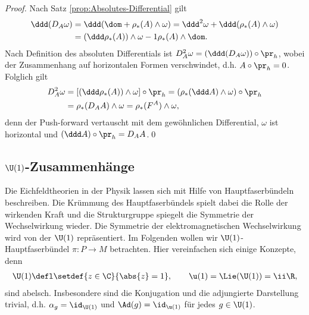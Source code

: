 \documentclass[%
	paper=a5,%
	fleqn,%
	DIV=18,%
	BCOR=0mm,
	fontsize=11pt,
	titlepage=false,%
	bibliography=totoc,
	DIV=18,%
	twoside=true,
	pdftitle=Riemannsche Geometrie,
	pdfauthor=Uwe Semmelmann,
	numbers=noendperiod]%
	{scrbook}
\begin{document}
\begin{proof}
Nach Satz \ref{prop:Absolutes-Differential} gilt
\begin{align*}
\ddd (D_A \omega) &=
\ddd(\dom + \rho_*(A)\wedge \omega)
= \ddd^2\omega + \ddd(\rho_*(A)\wedge \omega)\\
&= (\ddd\rho_*(A))\wedge \omega -1 \rho_*(A)\wedge \dom. 
\end{align*}
Nach Definition des absoluten Differentials ist $D_A^2 \omega = (\ddd(
D_A\omega))\circ\pr_h$, wobei der Zusammenhang  auf horizontalen
Formen verschwindet, d.h. $A\circ\pr_h = 0$. Folglich gilt
\begin{align*}
D_A^2\omega &= [(\ddd\rho_*(A))\wedge \omega]\circ\pr_h
= (\rho_*(\ddd A)\wedge \omega)\circ\pr_h\\
&= \rho_*(D_A A)\wedge \omega
= \rho_*(F^A)\wedge \omega,
\end{align*}
denn der Push-forward vertauscht mit dem gewöhnlichen Differential, $\omega$ ist
horizontal und $(\ddd A)\circ\pr_h = D_A A$.\qed
\end{proof}




\subsection{$\U(1)$-Zusammenhänge}

Die Eichfeldtheorien in der Physik lassen sich mit Hilfe von Hauptfaserbündeln
beschreiben. Die Krümmung des Hauptfaserbündels spielt dabei die Rolle der
wirkenden Kraft und die Strukturgruppe spiegelt die Symmetrie der Wechselwirkung
wieder. Die Symmetrie der elektromagnetischen Wechselwirkung wird von der
$\U(1)$ repräsentiert. Im Folgenden wollen wir $\U(1)$-Hauptfaserbündel
$\pi: P\to M$ betrachten. Hier vereinfachen sich einige Konzepte, denn
\begin{align*}
\U(1) \defl \setdef{z\in\C}{\abs{z}=1},\qquad \u(1) = \Lie(\U(1))= 
\ii\R,
\end{align*}
sind abelsch. Insbesondere sind die Konjugation und die adjungierte Darstellung trivial,
d.h. $\alpha_g = \id_{\U(1)}$ und $\Ad(g) = \id_{\u(1)}$ für jedes $g\in \U(1)$.
\end{document}
